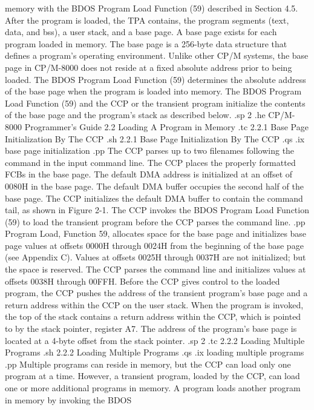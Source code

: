 memory with the BDOS Program Load Function (59) described in Section 4.5.
After the program is loaded, the TPA contains, the program
segments (text, data, and bss), a user stack, and a base page.  A
base page exists for each program loaded in memory.  The base page
is a 256-byte data structure that defines a program's operating
environment.  Unlike other CP/M systems, the base page in 
CP/M-8000 does not
reside at a fixed absolute address prior to being loaded.  The
BDOS Program Load Function (59) determines the absolute address
of the base page when the program is loaded into memory.  The BDOS Program Load
Function (59) and the CCP or the transient program initialize the
contents of the base page and the program's stack as described
below. 
.sp 2
.he CP/M-8000 Programmer's Guide      2.2  Loading A Program in Memory
.tc         2.2.1  Base Page Initialization By The CCP
.sh
2.2.1  Base Page Initialization By The CCP
.qs
.ix base page initialization
.pp 
The CCP parses up to two filenames following the command in the input
command line.  The CCP places the properly formatted FCBs in the base page.  
The default DMA address is initialized at an offset of 0080H in the base
page.  The default DMA buffer occupies the second half of the base page.  The
CCP initializes the default DMA buffer to contain the command tail, as
shown in Figure 2-1.  The CCP invokes the BDOS Program Load Function (59) to
load the transient program before the CCP parses the command line. 
.pp
Program Load, Function 59, allocates space for the base page and
initializes base page values at offsets 0000H through 0024H from the
beginning of the base page (see Appendix C).  Values at offsets 0025H
through 0037H are not initialized; but the space is reserved.  The CCP
parses the command line and initializes values at offsets 0038H through
00FFH.  Before the CCP gives control to the loaded program, the CCP pushes
the address of the transient program's base page and a return address
within the CCP on the user stack.  When the program is invoked, the top of
the stack contains a return address within the CCP, which is pointed to by
the stack pointer, register A7.  The address of the program's base page is
located at a 4-byte offset from the stack pointer. 
.sp 2
.tc         2.2.2  Loading Multiple Programs
.sh 
2.2.2  Loading Multiple Programs 
.qs
.ix loading multiple programs
.pp
Multiple programs can reside in memory, but the CCP can load only
one program at a time.  However, a transient program, loaded by
the CCP, can load one or more additional programs in memory.  A
program loads another program in memory by invoking the BDOS
